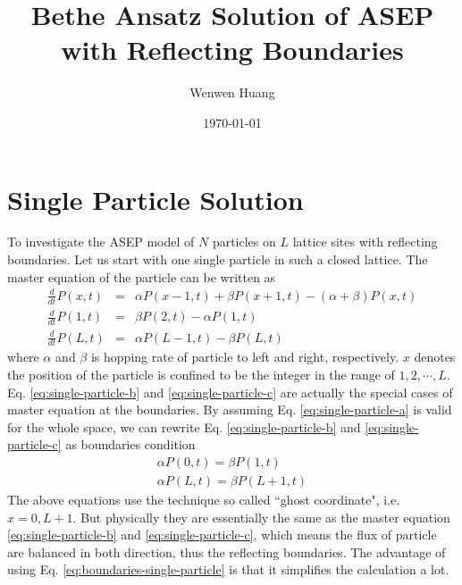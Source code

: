 \documentclass[12pt,a4paper]{article}
\begin{document}
\title{Bethe Ansatz Solution of ASEP with Reflecting Boundaries}
\author{Wenwen Huang}
\date{\today}
\maketitle

\section{Single Particle Solution}
\label{sec:single_particle_solution}

To investigate the ASEP model of $N$ particles on $L$ lattice sites with
reflecting boundaries. Let us start with one single particle in such a closed
lattice. The master equation of the particle can be written as
\begin{subequations}
\begin{eqnarray}
    \label{eq:single-particle-a}
    \frac{d}{dt} P(x,t) & = & \alpha P(x-1,t) + \beta P(x+1,t) - (\alpha +
    \beta)P(x,t) \\
    \label{eq:single-particle-b}
    \frac{d}{dt} P(1,t) & = & \beta P(2,t) - \alpha P(1,t) \\
    \label{eq:single-particle-c}
    \frac{d}{dt} P(L,t) & = & \alpha P(L-1,t) - \beta P(L,t)
\end{eqnarray}
\end{subequations}
where $\alpha$ and $\beta$ is hopping rate of particle to left and right,
respectively. $x$ denotes the position of the particle is confined to be the
integer in the range of $1,2,\cdots,L$. Eq.  \eqref{eq:single-particle-b} and
\eqref{eq:single-particle-c} are actually the special cases of master equation
at the boundaries.  By assuming Eq.  \eqref{eq:single-particle-a} is valid for
the whole space, we can rewrite Eq. \eqref{eq:single-particle-b} and
\eqref{eq:single-particle-c} as boundaries condition 
\begin{subequations}
    \label{eq:boundaries-single-particle}
\begin{eqnarray}
    \alpha P(0,t) = \beta P(1,t) \\
    \alpha P(L,t) = \beta P(L+1,t)
\end{eqnarray}
\end{subequations}
The above equations use the technique so called ``ghost coordinate", i.e.
$x=0,L+1$. But physically they are essentially the same as the master equation
\eqref{eq:single-particle-b} and \eqref{eq:single-particle-c}, which means the
flux of particle are balanced in both direction, thus the reflecting boundaries.
The advantage of using Eq. \eqref{eq:boundaries-single-particle} is that it
simplifies the calculation a lot.  
\end{document}
